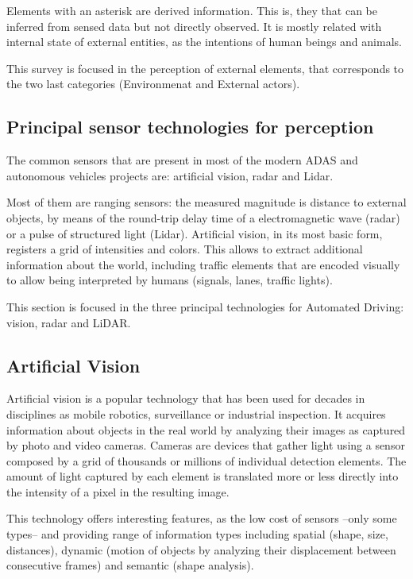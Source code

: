 Elements with an asterisk are derived information. This is, they that can 
be inferred from sensed data but not directly observed. It is mostly related 
with internal state of external entities, as the intentions of human beings and 
animals.

This survey is focused in the perception of external elements, that corresponds 
to the two last categories (Environmenat and External actors).

\subsection{Principal sensor technologies for perception}

The common sensors that are present in most of the modern ADAS and autonomous vehicles projects are: artificial vision, radar and Lidar.

Most of them are ranging sensors: the measured magnitude is distance to 
external objects, by means of the round-trip delay time of a electromagnetic 
wave (radar) or a pulse of structured light (Lidar).
Artificial vision, in its most basic form, registers a grid of intensities and 
colors. This allows to extract additional information about the world, including 
traffic elements that are encoded visually to allow being interpreted by humans 
(signals, lanes, traffic lights).

This section is focused in the three principal technologies for Automated 
Driving: vision, radar and LiDAR.


\subsection{Artificial Vision}
Artificial vision is a popular technology that has been used for decades in 
disciplines as mobile robotics, surveillance or industrial inspection. It acquires
information about objects in the real world by analyzing their images as 
captured by photo and video cameras. Cameras are devices that gather light using
a sensor composed by a grid of thousands or millions of individual detection 
elements. The amount of light captured by each element is translated more or 
less directly into the intensity of a pixel in the resulting image. 

This technology offers interesting features, as the low cost of sensors --only 
some types-- and providing range of information types including spatial
(shape, size, distances), dynamic (motion of objects by analyzing their 
displacement between consecutive frames) and semantic (shape analysis).

